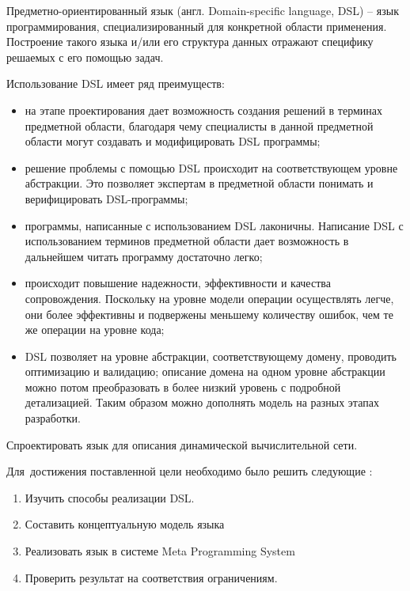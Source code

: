 
{\actuality} Предметно-ориентированный язык (англ. Domain-specific language, DSL) -- язык программирования, специализированный для конкретной области применения. Построение такого языка и/или его структура данных отражают специфику решаемых с его помощью задач.

Использование DSL имеет ряд преимуществ:
\begin{itemize}
	\item на этапе проектирования дает возможность создания решений в терминах предметной области, благодаря чему специалисты в данной предметной области могут создавать и модифицировать DSL программы;
	\item решение проблемы с помощью DSL происходит на соответствующем уровне абстракции. Это позволяет экспертам в предметной области понимать и верифицировать DSL-программы;
	\item программы, написанные с использованием DSL лаконичны. Написание DSL с использованием терминов предметной области дает возможность в дальнейшем читать программу достаточно легко;
	\item происходит повышение надежности, эффективности и качества сопровождения. Поскольку на уровне модели операции осуществлять легче, они более эффективны и подвержены меньшему количеству ошибок, чем те же операции на уровне кода;
	\item DSL позволяет на уровне абстракции, соответствующему домену, проводить оптимизацию и валидацию;
	описание домена на одном уровне абстракции можно потом преобразовать в более низкий уровень с подробной детализацией. Таким образом можно дополнять модель на разных этапах разработки.
\end{itemize}

{\aim} Спроектировать язык для описания динамической вычислительной сети.

Для~достижения поставленной цели необходимо было решить следующие {\tasks}:
\begin{enumerate}
  \item Изучить способы реализации DSL.
  \item Составить концептуальную модель языка
  \item Реализовать язык в системе Meta Programming System
  \item Проверить результат на соответствия ограничениям.
\end{enumerate}
    

